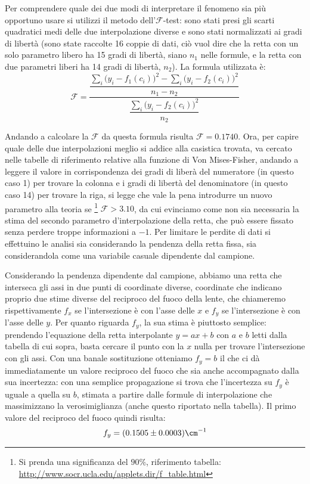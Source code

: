 Per comprendere quale dei due modi di interpretare il fenomeno sia più opportuno usare si utilizzi il metodo dell'$\mathcal{F}$-test:
 sono stati presi gli scarti quadratici medi delle due interpolazione diverse e sono stati normalizzati ai gradi di libertà
 (sono state raccolte 16 coppie di dati, ciò vuol dire che la retta con un solo parametro libero ha 15 gradi di libertà,
 siano $n_1$ nelle formule, e la retta con due parametri liberi ha 14 gradi di libertà, $n_2$).
 La formula utilizzata è:
\[\mathcal{F}=\frac{\dfrac{{\sum_i \big( y_i-f_1 (c_i) \big) ^2} - {\sum_i \big( y_i-f_2 (c_i) \big) ^2}}{n_1-n_2}}{\dfrac{\sum_i \big( y_i-f_2 
(c_i) \big) ^2}{n_2}}\]

Andando a calcolare la $\mathcal{F}$ da questa formula risulta $\mathcal{F} = 0.1740$. Ora, per capire quale delle due interpolazioni meglio si addice alla
 casistica trovata, va cercato nelle tabelle di riferimento relative alla funzione di Von Mises-Fisher, andando a leggere il valore
 in corrispondenza dei gradi di liberà del numeratore (in questo caso 1) per trovare la colonna e i gradi di libertà del denominatore
 (in questo caso 14) per trovare la riga, si legge che vale la pena introdurre un nuovo parametro alla teoria 
 se \footnote{Si prenda una significanza del $90\%$, riferimento tabella: \url{http://www.socr.ucla.edu/applets.dir/f_table.html}} $\mathcal{F} > 3.10$, 
 da cui evinciamo come non sia necessaria la stima del secondo parametro d'interpolazione della retta, che può essere fissato senza perdere
 troppe informazioni a $-1$. Per limitare le perdite di dati si effettuino le analisi sia considerando la pendenza della retta fissa,
 sia considerandola come una variabile casuale dipendente dal campione.

Considerando la pendenza dipendente dal campione, abbiamo una retta che interseca gli assi in due punti di coordinate diverse,
 coordinate che indicano proprio due stime diverse del reciproco del fuoco della lente, che chiameremo rispettivamente
$f_x$ se l'intersezione è con l'asse delle $x$ e $f_y$ se l'intersezione è con l'asse delle $y$.
 Per quanto riguarda $f_y$, la sua stima è piuttosto semplice: prendendo l'equazione della retta interpolante $y=ax + b$
 con $a$ e $b$ letti dalla tabella di cui sopra, basta cercare il punto con la $x$ nulla per trovare l'intersezione con gli assi.
 Con una banale sostituzione otteniamo $f_y= b$ il che ci dà immediatamente un valore reciproco del fuoco che sia anche
 accompagnato dalla sua incertezza: con una semplice propagazione si trova che l'incertezza su $f_y$ è uguale a quella su $b$,
 stimata a partire dalle formule di interpolazione che massimizzano la verosimiglianza (anche questo riportato nella tabella).
 Il primo valore del reciproco del fuoco quindi risulta:
\[f_y = (0.1505 \pm 0.0003) \cm^{-1}\]

